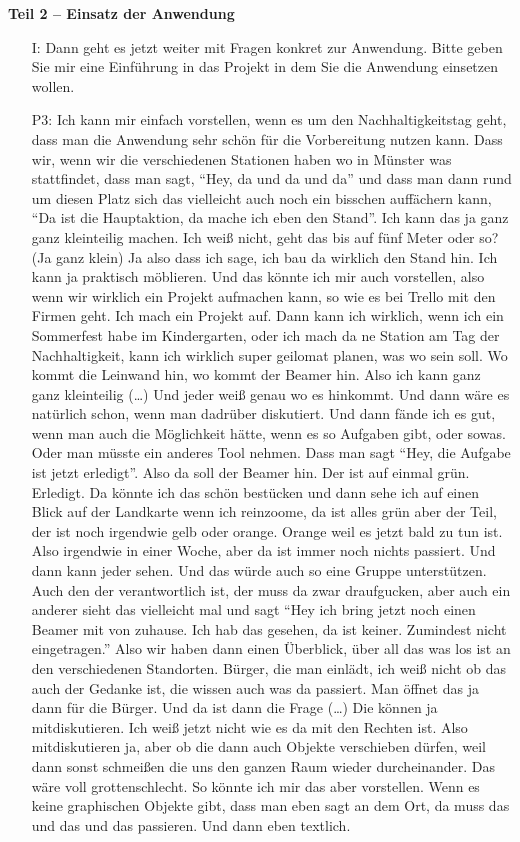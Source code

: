 \textbf{Teil 2 -- Einsatz der Anwendung}
\begin{itemize}
    \item[I:] Dann geht es jetzt weiter mit Fragen konkret zur Anwendung. Bitte geben Sie mir eine Einf{\"u}hrung in das Projekt in dem Sie die Anwendung einsetzen wollen.
    \item[P3:] Ich kann mir einfach vorstellen, wenn es um den Nachhaltigkeitstag geht, dass man die Anwendung sehr sch{\"o}n f{\"u}r die Vorbereitung nutzen kann. Dass wir, wenn wir die verschiedenen Stationen haben wo in M{\"u}nster was stattfindet, dass man sagt, "`Hey, da und da und da"' und dass man dann rund um diesen Platz sich das vielleicht auch noch ein bisschen auff{\"a}chern kann, "`Da ist die Hauptaktion, da mache ich eben den Stand"'. Ich kann das ja ganz ganz kleinteilig machen. Ich wei{\ss} nicht, geht das bis auf f{\"u}nf Meter oder so? (Ja ganz klein) Ja also dass ich sage, ich bau da wirklich den Stand hin. Ich kann ja praktisch m{\"o}blieren. Und das k{\"o}nnte ich mir auch vorstellen, also wenn wir wirklich ein Projekt aufmachen kann, so wie es bei Trello mit den Firmen geht. Ich mach ein Projekt auf. Dann kann ich wirklich, wenn ich ein Sommerfest habe im Kindergarten, oder ich mach da ne Station am Tag der Nachhaltigkeit, kann ich wirklich super geilomat planen, was wo sein soll. Wo kommt die Leinwand hin, wo kommt der Beamer hin. Also ich kann ganz ganz kleinteilig (\dots) Und jeder wei{\ss} genau wo es hinkommt. Und dann w{\"a}re es nat{\"u}rlich schon, wenn man dadr{\"u}ber diskutiert. Und dann f{\"a}nde ich es gut, wenn man auch die M{\"o}glichkeit h{\"a}tte, wenn es so Aufgaben gibt, oder sowas. Oder man m{\"u}sste ein anderes Tool nehmen. Dass man sagt "`Hey, die Aufgabe ist jetzt erledigt"'. Also da soll der Beamer hin. Der ist auf einmal gr{\"u}n. Erledigt. Da k{\"o}nnte ich das sch{\"o}n best{\"u}cken und dann sehe ich auf einen Blick auf der Landkarte wenn ich reinzoome, da ist alles gr{\"u}n aber der Teil, der ist noch irgendwie gelb oder orange. Orange weil es jetzt bald zu tun ist. Also irgendwie in einer Woche, aber da ist immer noch nichts passiert. Und dann kann jeder sehen. Und das w{\"u}rde auch so eine Gruppe unterst{\"u}tzen. Auch den der verantwortlich ist, der muss da zwar draufgucken, aber auch ein anderer sieht das vielleicht mal und sagt "`Hey ich bring jetzt noch einen Beamer mit von zuhause. Ich hab das gesehen, da ist keiner. Zumindest nicht eingetragen."' Also wir haben dann einen {\"U}berblick, {\"u}ber all das was los ist an den verschiedenen Standorten. B{\"u}rger, die man einl{\"a}dt, ich wei{\ss} nicht ob das auch der Gedanke ist, die wissen auch was da passiert. Man {\"o}ffnet das ja dann f{\"u}r die B{\"u}rger. Und da ist dann die Frage (\dots) Die k{\"o}nnen ja mitdiskutieren. Ich wei{\ss} jetzt nicht wie es da mit den Rechten ist. Also mitdiskutieren ja, aber ob die dann auch Objekte verschieben d{\"u}rfen, weil dann sonst schmei{\ss}en die uns den ganzen Raum wieder durcheinander. Das w{\"a}re voll grottenschlecht. So k{\"o}nnte ich mir das aber vorstellen. Wenn es keine graphischen Objekte gibt, dass man eben sagt an dem Ort, da muss das und das und das passieren. Und dann eben textlich.

\end{itemize}
